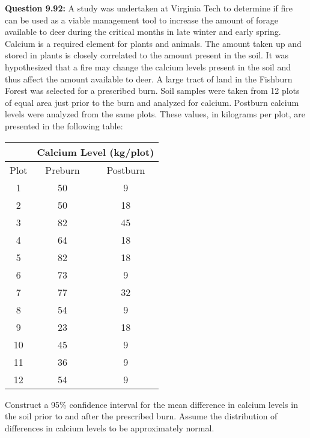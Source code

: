 \documentclass{article}
\begin{document}
\textbf{Question 9.92:}
A study was undertaken at Virginia Tech to determine if 
fire can be used as a viable management tool to increase 
the amount of forage available to deer during the critical 
months in late winter and early spring. Calcium is a 
required element for plants and animals. The amount taken 
up and stored in plants is closely correlated to the amount 
present in the soil. It was hypothesized that a fire may 
change the calcium levels present in the soil and thus 
affect the amount available to deer. A large tract of land 
in the Fishburn Forest was selected for a prescribed burn. 
Soil samples were taken from 12 plots of equal area just 
prior to the burn and analyzed for calcium. Postburn 
calcium levels were analyzed from the same plots. These 
values, in kilograms per plot, are presented in the 
following table:
\begin{center}
\begin{tabular}{c c c}
    & \multicolumn{2}{c}{Calcium Level (kg/plot)}\\
    \hline
    Plot & Preburn & Postburn \\
    \hline
    1  & 50 & 9  \\
    2  & 50 & 18 \\
    3  & 82 & 45 \\
    4  & 64 & 18 \\
    5  & 82 & 18 \\
    6  & 73 & 9  \\
    7  & 77 & 32 \\
    8  & 54 & 9  \\
    9  & 23 & 18 \\
    10 & 45 & 9  \\
    11 & 36 & 9  \\
    12 & 54 & 9  \\
\end{tabular}
\end{center}
Construct a 95\% confidence interval for the mean 
difference in calcium levels in the soil prior to and 
after the prescribed burn. Assume the distribution of 
differences in calcium levels to be approximately normal.
\\\newline
\end{document}
